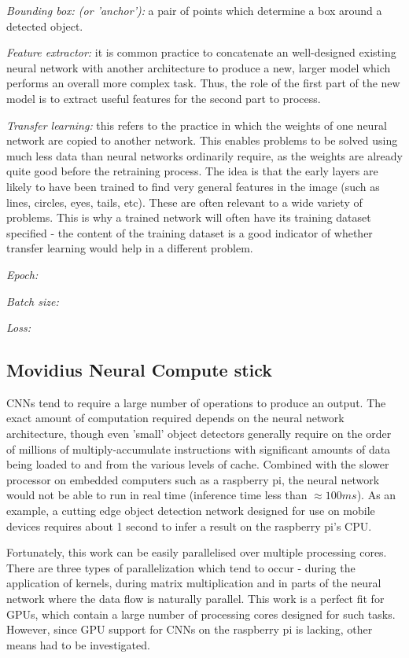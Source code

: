 \textit{Bounding box: (or 'anchor'):} a pair of points which determine a box around a detected object.

\textit{Feature extractor:} it is common practice to concatenate an well-designed existing neural network with another architecture to produce a new, larger model which performs an overall more complex task. Thus, the role of the first part of the new model is to extract useful features for the second part to process.

\textit{Transfer learning:} this refers to the practice in which the weights of one neural network are copied to another network. This enables problems to be solved using much less data than neural networks ordinarily require, as the weights are already quite good before the retraining process. The idea is that the early layers are likely to have been trained to find very general features in the image (such as lines, circles, eyes, tails, etc). These are often relevant to a wide variety of problems. This is why a trained network will often have its training dataset specified - the content of the training dataset is a good indicator of whether transfer learning would help in a different problem.

\textit{Epoch:}

\textit{Batch size:}

\textit{Loss:}

\subsection{Movidius Neural Compute stick}
CNNs tend to require a large number of operations to produce an output. The exact amount of computation required depends on the neural network architecture, though even 'small' object detectors generally require on the order of millions of multiply-accumulate instructions with significant amounts of data being loaded to and from the various levels of cache. Combined with the slower processor on embedded computers such as a raspberry pi, the neural network would not be able to run in real time (inference time less than $\approx 100ms$). As an example, a cutting edge object detection network designed for use on mobile devices requires about 1 second to infer a result on the raspberry pi's CPU.


Fortunately, this work can be easily parallelised over multiple processing cores. There are three types of parallelization which tend to occur - during the application of kernels, during matrix multiplication and in parts of the neural network where the data flow is naturally parallel. This work is a perfect fit for GPUs, which contain a large number of processing cores designed for such tasks. However, since GPU support for CNNs on the raspberry pi is lacking, other means had to be investigated.

